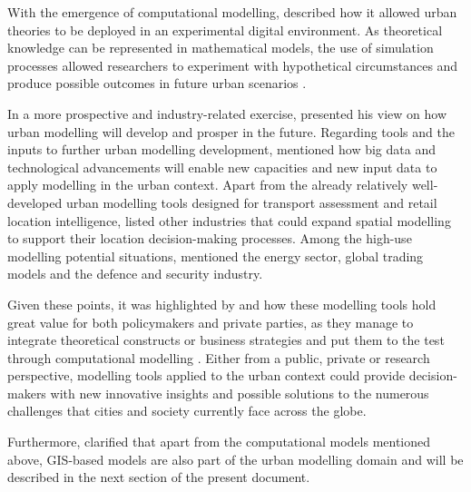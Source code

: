 \documentclass[12pt, a4paper]{report}
\begin{document}
With the emergence of computational modelling, \cite{battyUrbanModeling2009a} described how it allowed urban theories to be deployed in an experimental digital environment. As theoretical knowledge can be represented in mathematical models, the use of simulation processes allowed researchers to experiment with hypothetical circumstances and produce possible outcomes in future urban scenarios \citep{battyUrbanModeling2009a}.


In a more prospective and industry-related exercise, \cite{wilsonFutureUrbanModelling2018} presented his view on how urban modelling will develop and prosper in the future. Regarding tools and the inputs to further urban modelling development, \cite{wilsonFutureUrbanModelling2018} mentioned how big data and technological advancements will enable new capacities and new input data to apply modelling in the urban context. Apart from the already relatively well-developed urban modelling tools designed for transport assessment and retail location intelligence, \cite{wilsonFutureUrbanModelling2018} listed other industries that could expand spatial modelling to support their location decision-making processes. Among the high-use modelling potential situations, \cite{wilsonFutureUrbanModelling2018} mentioned the energy sector, global trading models and the defence and security industry.


Given these points, it was highlighted by \cite{battyUrbanModeling2009a} and \cite{wilsonFutureUrbanModelling2018} how these modelling tools hold great value for both policymakers and private parties, as they manage to integrate theoretical constructs or business strategies and put them to the test through computational modelling \citep{battyUrbanModeling2009a}. Either from a public, private or research perspective, modelling tools applied to the urban context could provide decision-makers with new innovative insights and possible solutions to the numerous challenges that cities and society currently face across the globe.

Furthermore, \cite{battyUrbanModeling2009a} clarified that apart from the computational models mentioned above, GIS-based models are also part of the urban modelling domain and will be described in the next section of the present document.
\end{document}
